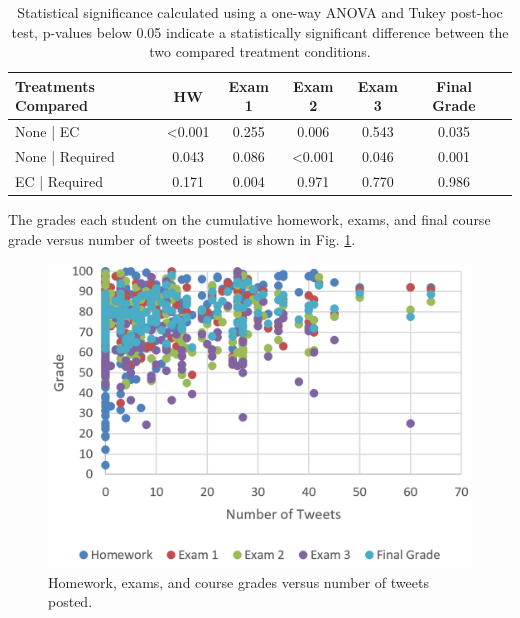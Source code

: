 \documentclass[12pt]{article}
\begin{document}
\begin{table}[H]
\caption{Statistical significance calculated using a one-way ANOVA and Tukey post-hoc test, p-values below 0.05 indicate a statistically significant difference between the two compared treatment conditions.}
\begin{center}
\label{ANOVA}
\begin{tabular}{lcccccc}
\hline
 Treatments Compared & HW & Exam 1 & Exam 2 & Exam 3 & Final Grade\\
\hline
 None | EC & \textless 0.001 & 0.255 & 0.006 & 0.543 & 0.035\\ 
 None | Required & 0.043 & 0.086 & \textless 0.001 & 0.046 & 0.001\\ 
 EC | Required & 0.171 & 0.004 & 0.971 & 0.770 & 0.986\\ 
\hline
\end{tabular}
\end{center}
\end{table}

The grades each student on the cumulative homework, exams, and final course grade versus number of tweets posted is shown in Fig. \ref{fig:numTweets}.

\begin{figure}[hbtp]
\centering
\includegraphics[width=\textwidth]{figures/numTweets.png}
\caption{Homework, exams, and course grades versus number of tweets posted.}
\label{fig:numTweets}
\end{figure}


\end{document}
